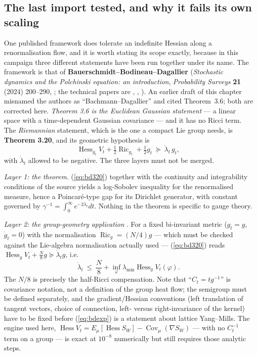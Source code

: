 \subsection{The last import tested, and why it fails its own scaling}
\label{sec:polchinski}

One published framework does tolerate an indefinite Hessian along a renormalisation flow, and it is
worth stating its scope exactly, because in this campaign three different statements have been run
together under its name. The framework is that of \textbf{Bauerschmidt--Bodineau--Dagallier}
(\emph{Stochastic dynamics and the Polchinski equation: an introduction}, \emph{Probability Surveys}
\textbf{21} (2024) 200--290, ; the technical papers are
, , ). An earlier draft of this
chapter misnamed the authors as ``Bachmann--Dagallier'' and cited Theorem~3.6; both are corrected
here. \emph{Theorem 3.6 is the Euclidean Gaussian statement} --- a linear space with a time-dependent
Gaussian covariance --- and it has no Ricci term. The \emph{Riemannian} statement, which is the one a
compact Lie group needs, is \textbf{Theorem 3.20}, and its geometric hypothesis is
\begin{equation}
\operatorname{Hess}_{g_t}V_t+\tfrac12\operatorname{Ric}_{g_t}+\tfrac12\dot g_t
\ \succeq\ \dot\lambda_t\,g_t ,
\label{eq:bd320}
\end{equation}
with $\dot\lambda_t$ allowed to be negative. The three layers must not be merged.

\emph{Layer 1: the theorem.} (\ref{eq:bd320}) together with the continuity and integrability
conditions of the source yields a log-Sobolev inequality for the renormalised measure, hence a
Poincar\'e-type gap for its Dirichlet generator, with constant governed by
$\gamma^{-1}=\int_0^\infty e^{-2\lambda_t}dt$. Nothing in the theorem is specific to gauge theory.

\emph{Layer 2: the group-geometry application} \LT. For a fixed bi-invariant metric
($g_t=g$, $\dot g_t=0$) with the normalisation $\operatorname{Ric}_g=(N/4)g$ --- which must be checked
against the Lie-algebra normalisation actually used --- (\ref{eq:bd320}) reads
$\operatorname{Hess}_gV_t+\tfrac{N}{8}g\succeq\dot\lambda_t g$, i.e.
\begin{equation}
\dot\lambda_t\ \le\ \frac N8+\inf_{\varphi}\lambda_{\min}\operatorname{Hess}_gV_t(\varphi).
\label{eq:bdexp}
\end{equation}
The $N/8$ is precisely the half-Ricci compensation. Note that ``$C_t=tg^{-1}$'' is covariance
notation, not a definition of the group heat flow; the semigroup must be defined separately, and the
gradient/Hessian conventions (left translation of tangent vectors, choice of connection, left- versus
right-invariance of the kernel) have to be fixed before (\ref{eq:bdexp}) is a statement about
lattice Yang--Mills. The engine used here, $\operatorname{Hess}V_t=E_\mu[\operatorname{Hess}S_W]
-\operatorname{Cov}_\mu(\nabla S_W)$ --- with no $C_t^{-1}$ term on a group --- is exact at
$10^{-8}$ numerically but still requires those analytic steps.

